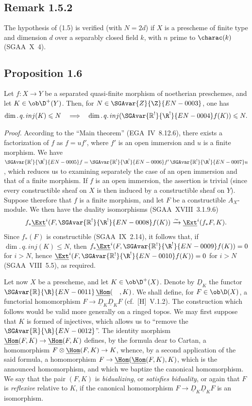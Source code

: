\subsection*{Remark 1.5.2}
The hypothesis of (1.5) is verified (with $N = 2d$) if $X$ is a prescheme of finite type and dimension $d$ over a separably closed field $k$, with $n$ prime to $\charac(k)$ (SGAA~X~4).

\subsection*{Proposition 1.6}
Let $f : X \to Y$ be a separated quasi-finite morphism of noetherian preschemes, and let $K \in \ob \D^{+}(Y)$. Then, for $N \in \SGAvar{Z}{\Z}{EN-0003}$, one has
\[
\dim.\,q.\,inj(K) \leqslant N \quad \Longrightarrow \quad \dim.\,q.\,inj(\SGAvar{\mathbb{R}^{!}}{\R^{!}}{EN-0004}f(K)) \leqslant N.
\]

\emph{Proof.} According to the ``Main theorem'' (EGA~IV~8.12.6), there exists a factorization of $f$ as $f = uf'$, where $f'$ is an open immersion and $u$ is a finite morphism. We have $\SGAvar{\mathbb{R}^{!}}{\R^{!}}{EN-0005}f = \SGAvar{\mathbb{R}^{!}}{\R^{!}}{EN-0006}f' \, \SGAvar{\mathbb{R}^{!}}{\R^{!}}{EN-0007}u$, which reduces us to examining separately the case of an open immersion and that of a finite morphism. If $f$ is an open immersion, the assertion is trivial (since every constructible sheaf on $X$ is then induced by a constructible sheaf on $Y$). Suppose therefore that $f$ is a finite morphism, and let $F$ be a constructible $A_X$-module. We then have the duality isomorphisms (SGAA~XVIII~3.1.9.6)
\[
f_{*}\underline{\Ext}^i(F, \SGAvar{\mathbb{R}^{!}}{\R^{!}}{EN-0008}f(K)) \xrightarrow{\sim} \underline{\Ext}^i(f_{*}F, K).
\]
Since $f_{*}(F)$ is constructible (SGAA~IX~2.14), it follows that, if $\dim.\,q.\,inj(K) \leqslant N$, then $f_{*}\underline{\Ext}^i(F, \SGAvar{\mathbb{R}^{!}}{\R^{!}}{EN-0009}f(K)) = 0$ for $i > N$, hence $\underline{\Ext}^i(F, \SGAvar{\mathbb{R}^{!}}{\R^{!}}{EN-0010}f(K)) = 0$ for $i > N$ (SGAA~VIII~5.5), as required.

Let now $X$ be a prescheme, and let $K \in \ob \D^{+}(X)$. Denote by $\underline{D}_K$ the functor $\SGAvar{\mathbb{R}}{\R}{EN-0011}\,\underline{\Hom}(\quad, K)$. We shall define, for $F \in \ob \D(X)$, a functorial homomorphism $F \to \underline{D}_K \underline{D}_K F$ (cf.~[H]~V.1.2). The construction which follows would be valid more generally on a ringed topos. We may first suppose that $K$ is formed of injectives, which allows us to ``remove the $\SGAvar{\mathbb{R}}{\R}{EN-0012}$''. The identity morphism $\underline{\Hom}(F,K) \to \underline{\Hom}(F,K)$ defines, by the formula dear to Cartan, a homomorphism $F \otimes \underline{\Hom}(F,K) \to K$, whence, by a second application of the said formula, a homomorphism $F \to \underline{\Hom}(\underline{\Hom}(F,K), K)$, which is the announced homomorphism, and which we baptize the canonical homomorphism. We say that the pair $(F,K)$ is \emph{bidualizing}, or \emph{satisfies biduality}, or again that $F$ is \emph{reflexive} relative to $K$, if the canonical homomorphism $F \to \underline{D}_K \underline{D}_K F$ is an isomorphism.

